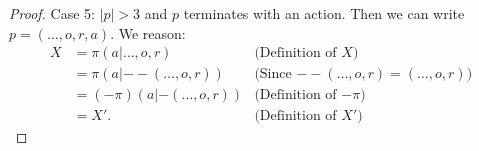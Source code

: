 \documentclass{article}
\begin{document}
\begin{proof}
    Case 5: $|p|>3$ and $p$ terminates with an action.
    Then we can write $p=(\ldots,o,r,a)$. We reason:
    \begin{align*}
        X &= \pi(a|\ldots,o,r)
            &\mbox{(Definition of $X$)}\\
          &= \pi(a|--(\ldots,o,r))
            &\mbox{(Since $--(\ldots,o,r)=(\ldots,o,r))$}\\
          &= (-\pi)(a|-(\ldots,o,r))
            &\mbox{(Definition of $-\pi$)}\\
          &= X'. &\mbox{(Definition of $X'$)}
    \end{align*}
\end{proof}




\end{document}
